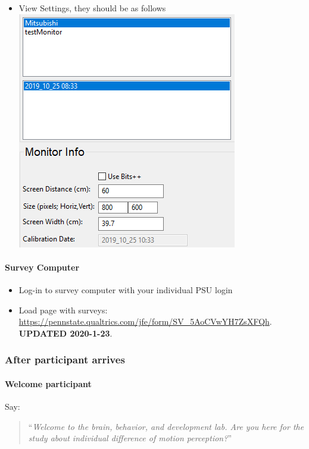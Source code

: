 \documentclass[]{article}
\providecommand{\tightlist}{%
  \setlength{\itemsep}{0pt}\setlength{\parskip}{0pt}}
\let\oldparagraph\paragraph
\renewcommand{\paragraph}[1]{\oldparagraph{#1}\mbox{}}
\begin{document}
\begin{itemize}
\item
  View Settings, they should be as follows\\
  \includegraphics{images/pp3.PNG}
\end{itemize}

\paragraph{Survey Computer}\label{survey-computer}

\begin{itemize}
\tightlist
\item
  Log-in to survey computer with your individual PSU login
\item
  Load page with surveys:
  \url{https://pennstate.qualtrics.com/jfe/form/SV_5AoCVwYH7ZsXFQh}.
  \textbf{UPDATED 2020-1-23}.
\end{itemize}

\subsubsection{After participant
arrives}\label{after-participant-arrives}

\paragraph{Welcome participant}\label{welcome-participant}

Say:

\begin{quote}
``\emph{Welcome to the brain, behavior, and development lab. Are you
here for the study about individual difference of motion perception?}''
\end{quote}
\end{document}
